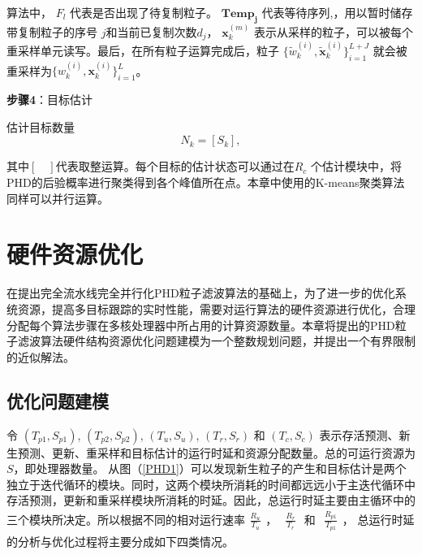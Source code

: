 算法中， $F_l$ 代表是否出现了待复制粒子。
$\mathbf{Temp_j}$ 代表等待序列,，用以暂时储存带复制粒子的序号 $j$和当前已复制次数$d_j$， $\mathbf{x}_k^{(m)}$ 表示从采样的粒子，可以被每个重采样单元读写。最后，在所有粒子运算完成后，粒子 $\{\tilde{w}_k^{(i)},\tilde{\mathbf{x}}_k^{(i)}\}_{i=1}^{L+J}$ 就会被重采样为$\{w_k^{(i)},\mathbf{x}_k^{(i)}\}_{i=1}^{L}$。


\textbf{步骤4}：目标估计

估计目标数量
\begin{equation}\label{Eq:07}
N_k=[S_{k}],
\end{equation}

其中$[\quad]$代表取整运算。每个目标的估计状态可以通过在$R_c$ 个估计模块中，将PHD的后验概率进行聚类得到各个峰值所在点。本章中使用的K-means聚类算法同样可以并行运算\cite{joshi2003parallel}。

\section{硬件资源优化}

在提出完全流水线完全并行化PHD粒子滤波算法的基础上，为了进一步的优化系统资源，提高多目标跟踪的实时性能，需要对运行算法的硬件资源进行优化，合理分配每个算法步骤在多核处理器中所占用的计算资源数量。本章将提出的PHD粒子滤波算法硬件结构资源优化问题建模为一个整数规划问题，并提出一个有界限制的近似解法。

\subsection{优化问题建模}

令 $(T_{p1},S_{p1})$, $(T_{p2},S_{p2})$, $(T_{u},S_u)$, $(T_{r},S_r)$ 和 $(T_{c},S_c)$ 表示存活预测、新生预测、更新、重采样和目标估计的运行时延和资源分配数量。总的可运行资源为$S$，即处理器数量。
从图（\ref{PHD1}）可以发现新生粒子的产生和目标估计是两个独立于迭代循环的模块。同时，这两个模块所消耗的时间都远远小于主迭代循环中存活预测，更新和重采样模块所消耗的时延。因此，总运行时延主要由主循环中的三个模块所决定。所以根据不同的相对运行速率$\begin{aligned}\frac{R_{u}}{T_{u}}\end{aligned}$， $\begin{aligned}\frac{R_{r}}{T_{r}}\end{aligned}$ 和 $\begin{aligned}\frac{R_{p1}}{T_{p1}}\end{aligned}$， 总运行时延的分析与优化过程将主要分成如下四类情况。

